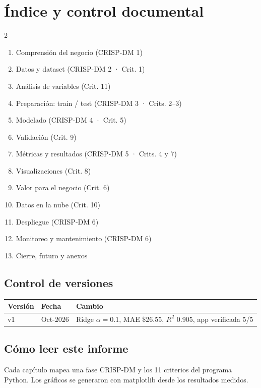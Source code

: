 \documentclass[11pt]{article}
\begin{document}
\section*{Índice y control documental}
\begin{multicols}{2}
\begin{enumerate}[leftmargin=*]
\item Comprensión del negocio (CRISP-DM 1)
\item Datos y dataset (CRISP-DM 2 · Crit. 1)
\item Análisis de variables (Crit. 11)
\item Preparación: train / test (CRISP-DM 3 · Crits. 2--3)
\item Modelado (CRISP-DM 4 · Crit. 5)
\item Validación (Crit. 9)
\item Métricas y resultados (CRISP-DM 5 · Crits. 4 y 7)
\item Visualizaciones (Crit. 8)
\item Valor para el negocio (Crit. 6)
\item Datos en la nube (Crit. 10)
\item Despliegue (CRISP-DM 6)
\item Monitoreo y mantenimiento (CRISP-DM 6)
\item Cierre, futuro y anexos
\end{enumerate}
\end{multicols}
\subsection*{Control de versiones}
\begin{tabular}{lll}
\toprule Versión & Fecha & Cambio \\
\midrule v1 & Oct-2026 & Ridge $\alpha{=}0.1$, MAE \$26.55, $R^2$ 0.905, app verificada 5/5 \\
\bottomrule
\end{tabular}
\subsection*{Cómo leer este informe}
Cada capítulo mapea una fase CRISP-DM y los 11 criterios del programa Python.
Los gráficos se generaron con matplotlib desde los resultados medidos.
\end{document}
